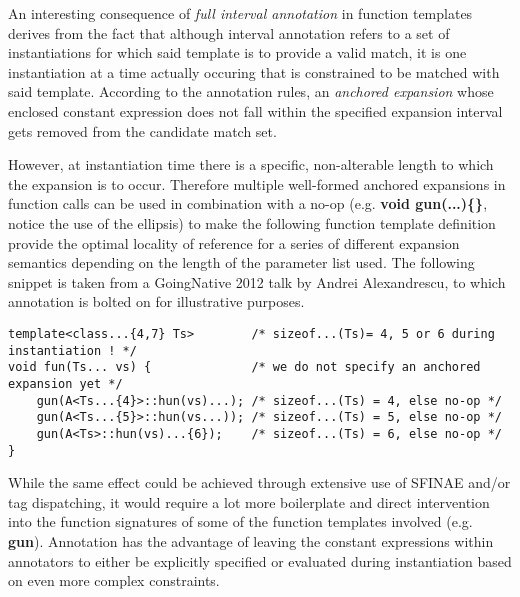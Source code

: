 
\p An interesting consequence of \textit{full interval annotation} in function templates derives from the fact that although interval annotation refers to a set of instantiations for which said template is to provide a valid match, it is one instantiation at a time actually occuring that is constrained to be matched with said template.
According to the annotation rules, an \textit{anchored expansion} whose enclosed constant expression does not fall within the specified expansion interval gets removed from the candidate match set.

\p However, at instantiation time there is a specific, non-alterable length to which the expansion is to occur. Therefore multiple well-formed anchored expansions in function calls can be used in combination with a no-op (e.g. \textbf{void gun(...)\{\}}, notice the use of the ellipsis) to make the following function template definition provide the optimal locality of reference for a series of different expansion semantics depending on the length of the parameter list used.
The following snippet is taken from a GoingNative 2012 talk\cite{Alexandrescu2012} by Andrei Alexandrescu, to which annotation is bolted on for illustrative purposes.
\begin{verbatim}
template<class...{4,7} Ts>        /* sizeof...(Ts)= 4, 5 or 6 during instantiation ! */
void fun(Ts... vs) {              /* we do not specify an anchored expansion yet */
    gun(A<Ts...{4}>::hun(vs)...); /* sizeof...(Ts) = 4, else no-op */
    gun(A<Ts...{5}>::hun(vs...)); /* sizeof...(Ts) = 5, else no-op */
    gun(A<Ts>::hun(vs)...{6});    /* sizeof...(Ts) = 6, else no-op */
}
\end{verbatim}
\p While the same effect could be achieved through extensive use of SFINAE and/or tag dispatching, it would require a lot more boilerplate and direct intervention into the function signatures of some of the function templates involved (e.g. \textbf{gun}).
Annotation has the advantage of leaving the constant expressions within annotators to either be explicitly specified or evaluated during instantiation based on even more complex constraints.